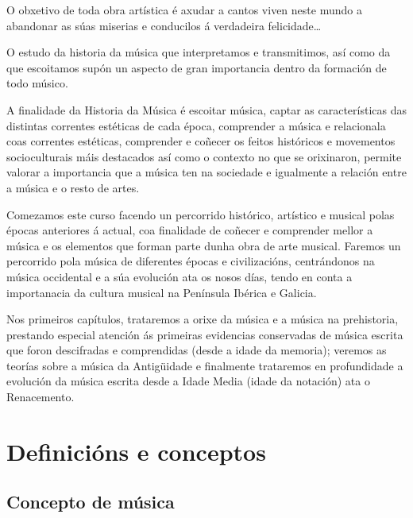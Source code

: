 \documentclass[a4paper, twoside]{templates/ociamthesis}
\begin{document}
\adjustmtc
{}

\begin{savequote}
O obxetivo de toda obra artística é axudar a cantos viven neste mundo a
abandonar as súas miserias e conducilos á verdadeira felicidade\ldots{}
\end{savequote}



O estudo da historia da música que interpretamos e transmitimos, así como da que escoitamos supón un aspecto de gran importancia dentro da formación de todo músico.

A finalidade da Historia da Música é escoitar música, captar as características das distintas correntes estéticas de cada época, comprender a música e relacionala coas correntes estéticas, comprender e coñecer os feitos históricos e movementos socioculturais máis destacados así como o contexto no que se orixinaron, permite valorar a importancia que a música ten na sociedade e igualmente a relación entre a música e o resto de artes.

Comezamos este curso facendo un percorrido histórico, artístico e musical polas épocas anteriores á actual, coa finalidade de coñecer e comprender mellor a música e os elementos que forman parte dunha obra de arte musical. Faremos un percorrido pola música de diferentes épocas e civilizacións, centrándonos na música occidental e a súa evolución ata os nosos días, tendo en conta a importanacia da cultura musical na Península Ibérica e Galicia.

Nos primeiros capítulos, trataremos a orixe da música e a música na prehistoria, prestando especial atención ás primeiras evidencias conservadas de música escrita que foron descifradas e comprendidas (desde a idade da memoria); veremos as teorías sobre a música da Antigüidade e finalmente trataremos en profundidade a evolución da música escrita desde a Idade Media (idade da notación) ata o Renacemento.

\hypertarget{definiciuxf3ns-e-conceptos}{%
\section*{Definicións e conceptos}\label{definiciuxf3ns-e-conceptos}}

\hypertarget{concepto-de-muxfasica}{%
\subsection*{Concepto de música}\label{concepto-de-muxfasica}}
\end{document}
